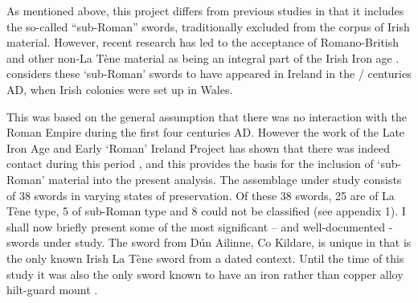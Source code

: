 As mentioned above, this project differs from previous studies in that it includes the so-called “sub-Roman” swords, traditionally excluded from the corpus of Irish material. However, recent research has led to the acceptance of Romano-British and other non-La Tène material as being an integral part of the Irish Iron age 
. 
\textcite[95]{Rynne1982} considers these ‘sub-Roman’ swords to have appeared in Ireland in the / centuries AD, 
when Irish colonies were set up in Wales.

This was based on the general assumption that there was no interaction with the Roman Empire during the first four centuries AD. 
However the work of the Late Iron Age and Early ‘Roman’ Ireland Project has shown that there was indeed contact during this period 
\parencite[esp. chapters 7--8]{CahillWilson2014}, 
and this provides the basis for the inclusion of ‘sub-Roman’ material into the present analysis. 
The assemblage under study consists of 38 swords in varying states of preservation. 
Of these 38 swords, 25 are of La Tène type, 5 of sub-Roman type and 8 could not be classified (see appendix 1). 
I shall now briefly present some of the most significant – and well-documented - swords under study. 
The sword from Dún Ailinne, Co Kildare, is unique in that is the only known Irish La Tène sword from a dated context. 
Until the time of this study it was also the only sword known to have an iron rather than copper alloy hilt-guard mount 
\parencite[88\psq]{Johnston2007}. 

